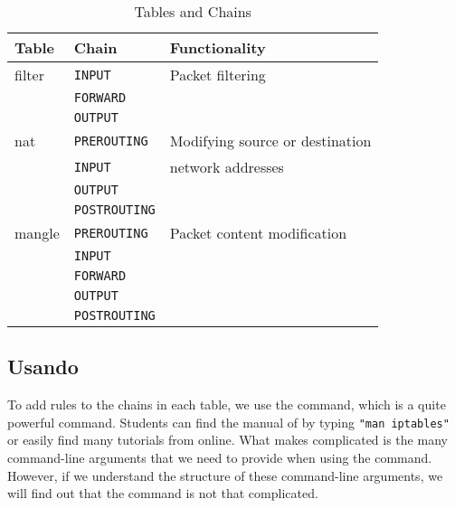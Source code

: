 \begin{table}[htb]
        \centering
        \caption{\iptables Tables and Chains}
        \label{firewall:table:iptables}
        \centering

        \begin{tabular}{|l|l|l|}
                \hline
                \bfseries Table & \bfseries Chain & \bfseries Functionality \\
                \hline\hline
                filter          &    \texttt{INPUT}      & Packet filtering \\
                                &    \texttt{FORWARD}    & \\
                                &    \texttt{OUTPUT}      & \\
                \hline
                nat             &   \texttt{PREROUTING}    & Modifying source or destination \\
                                &   \texttt{INPUT}      & network addresses \\
                                &   \texttt{OUTPUT}      & \\
                                &   \texttt{POSTROUTING}   & \\
                \hline
                mangle          &   \texttt{PREROUTING}    & Packet content modification \\
                                &   \texttt{INPUT}      & \\
                                &   \texttt{FORWARD}     & \\
                                &   \texttt{OUTPUT}      & \\
                                &   \texttt{POSTROUTING}   & \\
                \hline
        \end{tabular}
\end{table}


\subsection{Usando \iptables}


To add rules to the chains in each table, we use the \iptables command,
which is a quite powerful command. 
Students can find the manual of \iptables by typing \texttt{"man iptables"} 
or easily find many tutorials from online. 
What makes \iptables complicated is the many command-line arguments 
that we need to provide when
using the command. However, 
if we understand the structure of these command-line arguments, 
we will find out that the command is not that complicated. 


